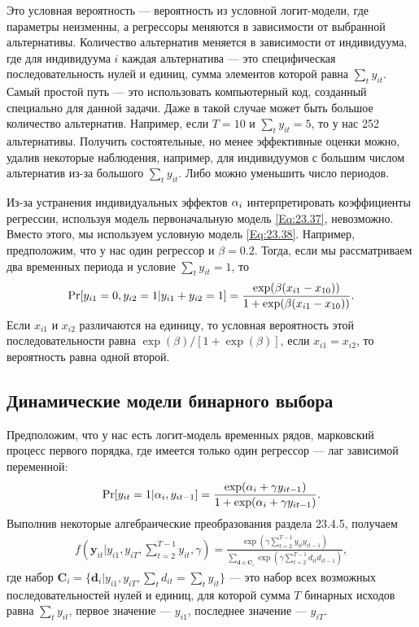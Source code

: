 Это условная вероятность --- вероятность из условной логит-модели, где параметры неизменны, а регрессоры меняются в зависимости от выбранной альтернативы. Количество альтернатив меняется в зависимости от индивидуума, где для индивидуума $i$ каждая альтернатива --- это специфическая последовательность нулей и единиц, сумма элементов которой равна $\sum_t y_{it}$. Самый простой путь --- это использовать компьютерный код, созданный специально для данной задачи. Даже в такой случае может быть большое количество альтернатив. Например, если $T=10$ и $\sum_t y_{it}=5$, то у нас 252 альтернативы. Получить состоятельные, но менее эффективные оценки можно, удалив некоторые наблюдения, например, для индивидуумов с большим числом альтернатив из-за большого $\sum_t y_{it}$. Либо можно уменьшить число периодов.

Из-за устранения индивидуальных эффектов $\ali$ интерпретировать коэффициенты регрессии, используя модель первоначальную модель \ref{Eq:23.37}, невозможно. Вместо этого, мы используем условную модель \ref{Eq:23.38}. Например, предположим, что у нас один регрессор и $\beta=0.2$. Тогда, если мы рассматриваем два временных периода и условие $\sum_t y_{it}=1$, то
\begin{align}
\P [y_{i1}=0, y_{i2}=1| y_{i1}+y_{i2}=1]= 
\frac{\exp (\beta(x_{i1}-x_{10}))}{1+\exp (\beta(x_{i1}-x_{10}))}.
\nonumber
\end{align}
Если $x_{i1}$ и $x_{i2}$ различаются на единицу, то условная вероятность этой последовательности равна $\exp (\beta)/[1+\exp  (\beta)]$, если $x_{i1}=x_{i2}$, то вероятность равна одной второй. 

\subsection{Динамические модели бинарного выбора}

Предположим, что у нас есть логит-модель временных рядов, марковский процесс первого порядка, где имеется только один регрессор --- лаг зависимой переменной:
\begin{align}
\P [y_{it}=1|\ali, y_{it-1}]= \frac{\exp (\ali+\gamma y_{it-1})}{1+\exp (\ali+\gamma y_{it-1})}.
\label{Eq:23.39}
\end{align}
Выполнив некоторые алгебраические преобразования раздела 23.4.5, получаем
\begin{align}
f(\mathbf{y}_{it}|y_{i1}, y_{iT}, \sum^{T-1}_{t=2} y_{it}, \gamma)= 
\frac{\exp (\gamma \sum^{T-1}_{t=2} y_{it} y_{it-1})}{\sum_{\mathbf{d} \in \mathbf{C}_i}\exp (\gamma \sum^{T-1}_{t=2} d_{it} d_{it-1})},
\label{Eq:23.40}
\end{align}
где набор $\mathbf{C}_i=\{ \mathbf{d}_i|y_{i1}, y_{iT}, \sum_t d_{it}=\sum_t y_{it} \}$ --- это набор всех возможных последовательностей нулей и единиц, для которой сумма $T$ бинарных исходов равна $\sum_t y_{it}$, первое значение --- $y_{i1}$, последнее значение --- $y_{iT}$.

